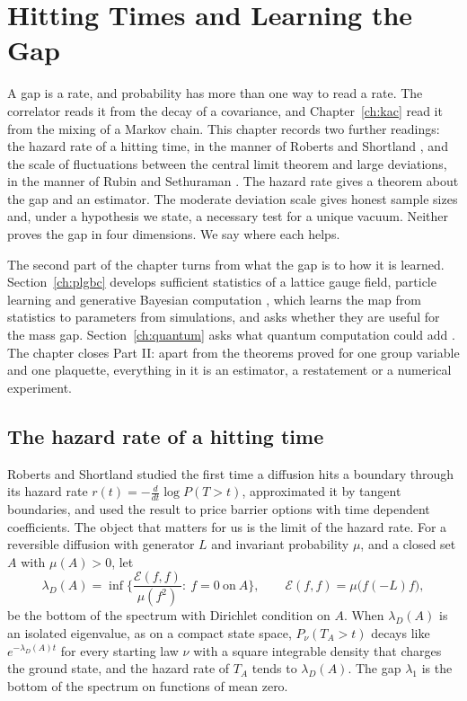 \chapter{Hitting Times and Learning the Gap}\label{ch:hitting}

A gap is a rate, and probability has more than one way to read a rate. The correlator reads it from the decay of a covariance, and Chapter~\ref{ch:kac} read it from the mixing of a Markov chain. This chapter records two further readings: the hazard rate of a hitting time, in the manner of Roberts and Shortland \cite{RS95,RS97}, and the scale of fluctuations between the central limit theorem and large deviations, in the manner of Rubin and Sethuraman \cite{RuSe65}. The hazard rate gives a theorem about the gap and an estimator. The moderate deviation scale gives honest sample sizes and, under a hypothesis we state, a necessary test for a unique vacuum. Neither proves the gap in four dimensions. We say where each helps.

The second part of the chapter turns from what the gap is to how it is learned. Section~\ref{ch:plgbc} develops sufficient statistics of a lattice gauge field, particle learning \cite{CJLP} and generative Bayesian computation \cite{PSgbc}, which learns the map from statistics to parameters from simulations, and asks whether they are useful for the mass gap. Section~\ref{ch:quantum} asks what quantum computation could add \cite{PSX23}. The chapter closes Part II: apart from the theorems proved for one group variable and one plaquette, everything in it is an estimator, a restatement or a numerical experiment.

\section{The hazard rate of a hitting time}

Roberts and Shortland studied the first time a diffusion hits a boundary through its hazard rate $r(t)=-\frac{d}{dt}\log P(T>t)$, approximated it by tangent boundaries, and used the result to price barrier options with time dependent coefficients. The object that matters for us is the limit of the hazard rate. For a reversible diffusion with generator $L$ and invariant probability $\mu$, and a closed set $A$ with $\mu(A)>0$, let
\[
\lambda_D(A)=\inf\Big\{\frac{\mathcal E(f,f)}{\mu(f^2)}:\ f=0\ \text{on}\ A\Big\},\qquad \mathcal E(f,f)=\mu\big(f(-L)f\big),
\]
be the bottom of the spectrum with Dirichlet condition on $A$. When $\lambda_D(A)$ is an isolated eigenvalue, as on a compact state space, $P_\nu(T_A>t)$ decays like $e^{-\lambda_D(A)t}$ for every starting law $\nu$ with a square integrable density that charges the ground state, and the hazard rate of $T_A$ tends to $\lambda_D(A)$. The gap $\lambda_1$ is the bottom of the spectrum on functions of mean zero.

